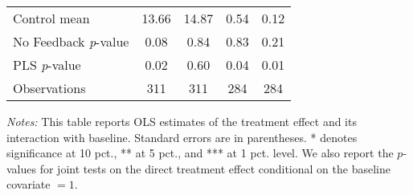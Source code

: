\begin{table}[ht]
{\begin{threeparttable}
\begin{tabular}{l*{4}{c}}
Control mean    &    13.66         &    14.87         &     0.54         &     0.12         \\
No Feedback \emph{p}-value&     0.08         &     0.84         &     0.83         &     0.21         \\
PLS \emph{p}-value&     0.02         &     0.60         &     0.04         &     0.01         \\
Observations    &      311         &      311         &      284         &      284         \\
\bottomrule \end{tabular} \begin{tablenotes}[flushleft] \footnotesize \item \emph{Notes:} This table reports OLS estimates of the treatment effect and its interaction with baseline. Standard errors are in parentheses. * denotes significance at 10 pct., ** at 5 pct., and *** at 1 pct. level. We also report the \(p\)-values for joint tests on the direct treatment effect conditional on the baseline covariate $= 1$. \end{tablenotes} \end{threeparttable} } \end{table}

